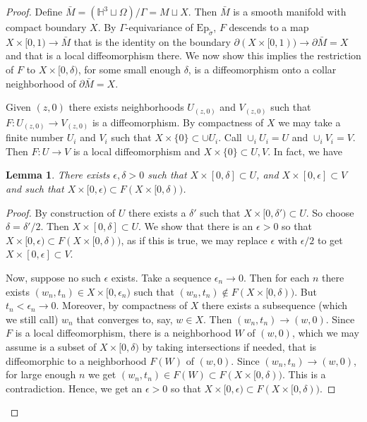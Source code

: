 \documentclass{amsart}
\renewcommand{\H}{\mathbb{H}}
\newtheorem*{lem*}{Lemma}
\begin{document}
\begin{proof}
Define $\bar{M} = ( \H^3 \sqcup \Omega ) /\Gamma = M \sqcup X$.
Then $\bar{M}$ is a smooth manifold with compact boundary $X$. 
By $\Gamma$-equivariance of $\mathrm{Ep}_{\tilde{\sigma}}$, $F$ descends to a map $X \times[0,1) \to \bar{M}$ that is the identity on the boundary $\partial(X \times [0,1)) \to \partial{\bar{M}} = X$ and that is a local diffeomorphism there. 
We now show this implies the restriction of $F$ to $X \times [0, \delta)$, for some small enough $\delta$, is a diffeomorphism onto a collar neighborhood of $\partial \bar{M} = X$. 

Given $(z,0)$ there exists neighborhoods $U_{(z,0)}$ and $V_{(z,0)}$ such that $F: U_{(z,0)} \to V_{(z,0)}$ is a diffeomorphism. 
By compactness of $X$ we may take a finite number $U_i$ and $V_i$ such that $X \times \{0\} \subset \cup U_i$. Call $\cup_i U_i = U$ and $\cup_i V_i = V$. Then $F: U \to V$ is a local diffeomorphism and $X \times \{0\} \subset U, V$. 
In fact, we have 
\begin{lem*}
There exists $\epsilon,\delta > 0$ such that $X \times [0,\delta] \subset U$, and $X \times [0,\epsilon] \subset V$ and such that $X \times [0,\epsilon) \subset F(X \times [0,\delta))$.
\end{lem*}
\begin{proof}
By construction of $U$ there exists a $\delta'$ such that $X \times [0,\delta') \subset U$. So choose $\delta = \delta'/2$. Then $X \times [0, \delta] \subset U$.
We show that there is an $\epsilon > 0$ so that $X \times [0,\epsilon) \subset F(X \times [0,\delta))$, as if this is true, we may replace $\epsilon$ with $\epsilon/2$ to get $X \times [0,\epsilon] \subset V$.

Now, suppose no such $\epsilon$ exists. 
Take a sequence $\epsilon_n \to 0$. 
Then for each $n$ there exists $(w_n, t_n) \in X \times [0, \epsilon_n)$ such that $(w_n,t_n) \notin F(X \times [0,\delta))$. 
But $t_n < \epsilon_n \to 0$. 
Moreover, by compactness of $X$ there exists a subsequence (which we still call) $w_n$ that converges to, say, $w \in X$. 
Then $(w_n,t_n) \to (w,0)$. 
Since $F$ is a local diffeomorphism, there is a neighborhood $W$ of $(w,0)$, which we may assume is a subset of $X \times [0,\delta)$ by taking intersections if needed, that is diffeomorphic to a neighborhood $F(W)$ of $(w,0)$. 
Since $(w_n, t_n) \to (w,0)$, for large enough $n$ we get $(w_n,t_n) \in F(W) \subset F(X \times [0,\delta))$. 
This is a contradiction. 
Hence, we get an $\epsilon >0$ so that $X \times [0,\epsilon) \subset F(X \times [0,\delta))$.
\end{proof}


\end{proof}
\end{document}
